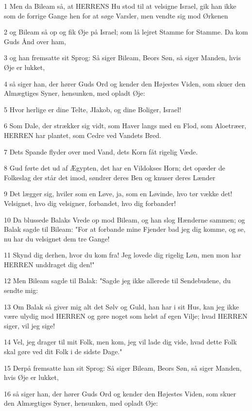 \par 1 Men da Bileam så, at HERRENS Hu stod til at velsigne Israel, gik han ikke som de forrige Gange hen for at søge Varsler, men vendte sig mod Ørkenen
\par 2 og Bileam så op og fik Øje på Israel; som lå lejret Stamme for Stamme. Da kom Guds Ånd over ham,
\par 3 og han fremsatte sit Sprog: Så siger Bileam, Beors Søn, så siger Manden, hvis Øje er lukket,
\par 4 så siger han, der hører Guds Ord og kender den Højestes Viden, som skuer den Almægtiges Syner, hensunken, med opladt Øje:
\par 5 Hvor herlige er dine Telte, JIakob, og dine Boliger, Israel!
\par 6 Som Dale, der strækker sig vidt, som Haver langs med en Flod, som Aloetræer, HERREN har plantet, som Cedre ved Vandets Bred.
\par 7 Dets Spande flyder over med Vand, dets Korn fåt rigelig Væde.
\par 8 Gud førte det ud af Ægypten, det har en Vildokses Horn; det opæder de Folkeslag der står det imod, søndrer deres Ben og knuser deres Lænder
\par 9 Det lægger sig, hviler som en Løve, ja, som en Løvinde, hvo tør vække det! Velsignet, hvo dig velsigner, forbandet, hvo dig forbander!
\par 10 Da blussede Balaks Vrede op mod Bileam, og han slog Hænderne sammen; og Balak sagde til Bileam: "For at forbande mine Fjender bad jeg dig komme, og se, nu har du velsignet dem tre Gange!
\par 11 Skynd dig derhen, hvor du kom fra! Jeg lovede dig rigelig Løn, men mon har HERREN unddraget dig den!"
\par 12 Men Bileam sagde til Balak: "Sagde jeg ikke allerede til Sendebudene, du sendte mig:
\par 13 Om Balak så giver mig alt det Sølv og Guld, han har i sit Hus, kan jeg ikke være ulydig mod HERREN og gøre noget som helst af egen Vilje; hvad HERREN siger, vil jeg sige!
\par 14 Vel, jeg drager til mit Folk, men kom, jeg vil lade dig vide, hvad dette Folk skal gøre ved dit Folk i de sidste Dage."
\par 15 Derpå fremsatte han sit Sprog: Så siger Bileam, Beors Søn, så siger Manden, hvis Øje er lukket,
\par 16 så siger han, der hører Guds Ord og kender den Højestes Viden, som skuer den Almægtiges Syner, hensunken, med opladt Øje:
